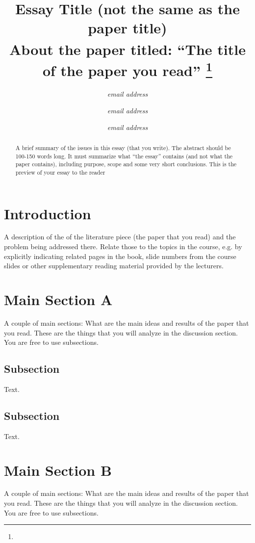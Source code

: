 \documentclass[conference]{IEEEtran}
\begin{document}
%
%
\title{Essay Title (not the same as the paper title)\\
{\footnotesize \textsuperscript{}About the paper titled: “The title of the paper you read”
}
\thanks{}
}
%
%
\author{
\textit{email address}
\and
{}
\textit{email address}
\and
{}
\textit{email address}
}
\maketitle
%
%
\begin{abstract}
A brief summary of the issues in this essay (that you write). The abstract should be 100-150 words long. It must summarize what “the essay” contains (and not what the paper contains), including purpose, scope and some very short conclusions. This is the preview of your essay to the reader
\end{abstract}
%
%
\section{Introduction}
A description of the of the literature piece (the paper that you read) and the problem being addressed there. Relate those to the topics in the course, e.g. by explicitly indicating related pages in the book, slide numbers from the course slides or other supplementary reading material provided by the lecturers.
%
%
\section{Main Section A}
A couple of main sections: What are the main ideas and results of the paper that you read. These are the things that you will analyze in the discussion section. You are free to use subsections.
\subsection{Subsection}
Text.
\subsection{Subsection}
Text.
%
%
\section{Main Section B}
A couple of main sections: What are the main ideas and results of the paper that you read. These are the things that you will analyze in the discussion section. You are free to use subsections.
\end{document}
